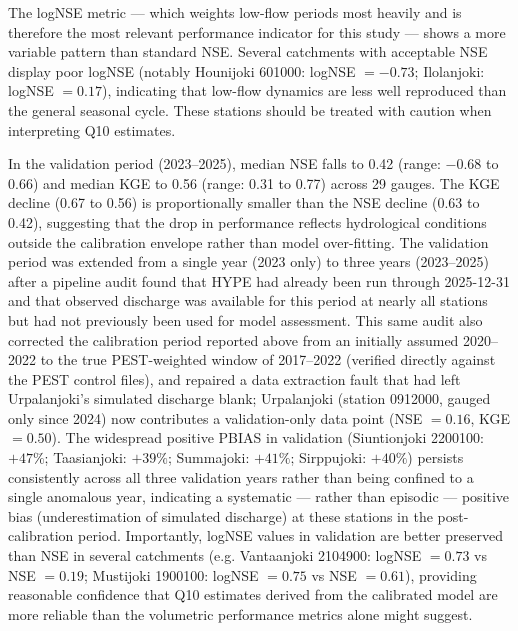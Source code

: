 \documentclass[draft]{agujournal2019}
\begin{document}
The logNSE metric — which weights low-flow periods most heavily and is therefore the most relevant performance indicator for this study — shows a more variable pattern than standard NSE. Several catchments with acceptable NSE display poor logNSE (notably Hounijoki 601000: logNSE $= -0.73$; Ilolanjoki: logNSE $= 0.17$), indicating that low-flow dynamics are less well reproduced than the general seasonal cycle. These stations should be treated with caution when interpreting Q10 estimates.

In the validation period (2023--2025), median NSE falls to 0.42 (range: $-$0.68 to 0.66) and median KGE to 0.56 (range: 0.31 to 0.77) across 29 gauges. The KGE decline (0.67 to 0.56) is proportionally smaller than the NSE decline (0.63 to 0.42), suggesting that the drop in performance reflects hydrological conditions outside the calibration envelope rather than model over-fitting. The validation period was extended from a single year (2023 only) to three years (2023--2025) after a pipeline audit found that HYPE had already been run through 2025-12-31 and that observed discharge was available for this period at nearly all stations but had not previously been used for model assessment. This same audit also corrected the calibration period reported above from an initially assumed 2020--2022 to the true PEST-weighted window of 2017--2022 (verified directly against the PEST control files), and repaired a data extraction fault that had left Urpalanjoki's simulated discharge blank; Urpalanjoki (station 0912000, gauged only since 2024) now contributes a validation-only data point (NSE $= 0.16$, KGE $= 0.50$). The widespread positive PBIAS in validation (Siuntionjoki 2200100: $+47\%$; Taasianjoki: $+39\%$; Summajoki: $+41\%$; Sirppujoki: $+40\%$) persists consistently across all three validation years rather than being confined to a single anomalous year, indicating a systematic — rather than episodic — positive bias (underestimation of simulated discharge) at these stations in the post-calibration period. Importantly, logNSE values in validation are better preserved than NSE in several catchments (e.g. Vantaanjoki 2104900: logNSE $= 0.73$ vs NSE $= 0.19$; Mustijoki 1900100: logNSE $= 0.75$ vs NSE $= 0.61$), providing reasonable confidence that Q10 estimates derived from the calibrated model are more reliable than the volumetric performance metrics alone might suggest.
\end{document}

